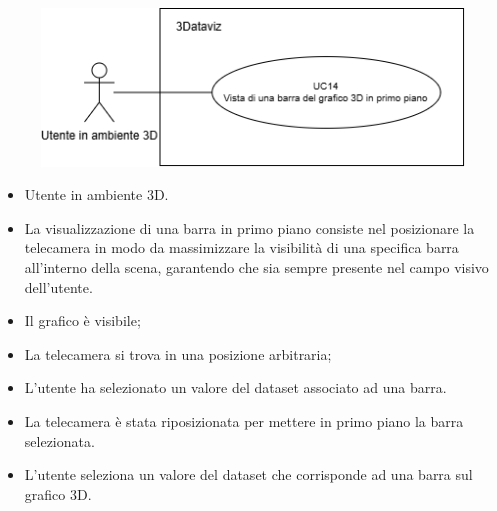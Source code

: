 \begin{figure}[h!]\centering
    \includegraphics[scale=0.7]{template/images/UC14.png}
    \caption{}
\end{figure}
\UCdsc
{ %
    \begin{itemize}
        \item Utente in ambiente 3D.
    \end{itemize}
}
{ %
    \begin{itemize}
        \item La visualizzazione di una barra in primo piano consiste nel posizionare la telecamera in modo da massimizzare la visibilità di una specifica barra all'interno della scena, garantendo che sia sempre presente nel campo visivo dell'utente.
    \end{itemize}
}
{ %
    \begin{itemize}
        \item Il grafico è visibile;
        \item La telecamera si trova in una posizione arbitraria;
        \item L'utente ha selezionato un valore del dataset associato ad una barra.
    \end{itemize}
}
{ %
    \begin{itemize}
        \item La telecamera è stata riposizionata per mettere in primo piano la barra selezionata.
    \end{itemize}
}
{ %
    \begin{itemize}
        \item L'utente seleziona un valore del dataset che corrisponde ad una barra sul grafico 3D.
    \end{itemize}
}


